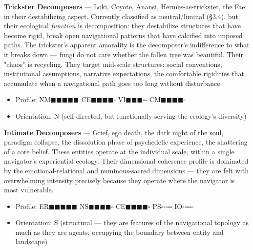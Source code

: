 \textbf{Trickster Decomposers} — Loki, Coyote, Anansi, Hermes-as-trickster, the Fae in their destabilizing aspect. Currently classified as neutral/liminal (§3.4), but their ecological \textit{function} is decomposition: they destabilize structures that have become rigid, break open navigational patterns that have calcified into imposed paths. The trickster's apparent amorality is the decomposer's indifference to what it breaks down — fungi do not care whether the fallen tree was beautiful. Their "chaos" is recycling. They target mid-scale structures: social conventions, institutional assumptions, narrative expectations, the comfortable rigidities that accumulate when a navigational path goes too long without disturbance.

\begin{itemize}[nosep,leftmargin=*]
  \item Profile: NM$\blacksquare$$\blacksquare$$\blacksquare$$\blacksquare$$\blacksquare$ CE$\blacksquare$$\blacksquare$$\blacksquare$$\blacksquare$$\square$ VI$\blacksquare$$\blacksquare$$\blacksquare$$\square$$\square$ CM$\blacksquare$$\blacksquare$$\blacksquare$$\blacksquare$$\square$
  \item Orientation: N (self-directed, but functionally serving the ecology's diversity)
\end{itemize}


\textbf{Intimate Decomposers} — Grief, ego death, the dark night of the soul, paradigm collapse, the dissolution phase of psychedelic experience, the shattering of a core belief. These entities operate at the individual scale, within a single navigator's experiential ecology. Their dimensional coherence profile is dominated by the emotional-relational and numinous-sacred dimensions — they are felt with overwhelming intensity precisely because they operate where the navigator is most vulnerable.

\begin{itemize}[nosep,leftmargin=*]
  \item Profile: ER$\blacksquare$$\blacksquare$$\blacksquare$$\blacksquare$$\blacksquare$ NS$\blacksquare$$\blacksquare$$\blacksquare$$\blacksquare$$\square$ CE$\blacksquare$$\blacksquare$$\blacksquare$$\blacksquare$$\square$ PS$\square$$\square$$\square$$\square$$\square$ IO$\square$$\square$$\square$$\square$$\square$
  \item Orientation: S (structural — they are features of the navigational topology as much as they are agents, occupying the boundary between entity and landscape)
\end{itemize}


